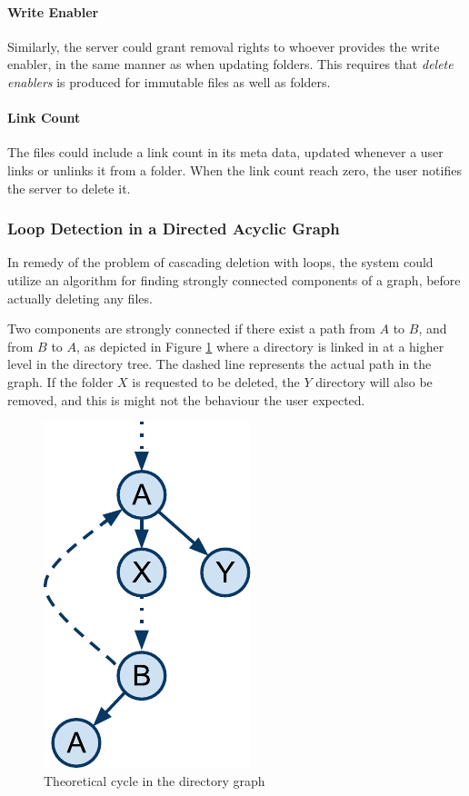 \documentclass[pdftex,english,10pt,b5paper,twoside]{book}
\begin{document}
\paragraph{Write Enabler} Similarly, the server could grant removal rights to
whoever provides the write enabler, in the same manner as when updating
folders. This requires that \emph{delete enablers} is produced for immutable
files as well as folders.

\paragraph{Link Count} The files could include a link count in its meta data,
updated whenever a user links or unlinks it from a folder. When the link count
reach zero, the user notifies the server to delete it.

\subsubsection{Loop Detection in a Directed Acyclic Graph}

In remedy of the problem of cascading deletion with loops, the system could
utilize an algorithm for finding strongly connected components of a graph,
before actually deleting any files.

Two components are strongly connected if there exist a path from $A$ to $B$,
and from $B$ to $A$, as depicted in Figure \ref{fig:DSC:cycles} where a
directory is linked in at a higher level in the directory tree. The dashed line
represents the actual path in the graph. If the folder $X$ is requested to be
deleted, the $Y$ directory will also be removed, and this is might not the
behaviour the user expected.

\begin{figure}[h!]
    \centering
    \includegraphics[scale=0.6]{CyclesintheDAG.pdf}
    \caption{Theoretical cycle in the directory graph}
    \label{fig:DSC:cycles}
\end{figure}
\end{document}

